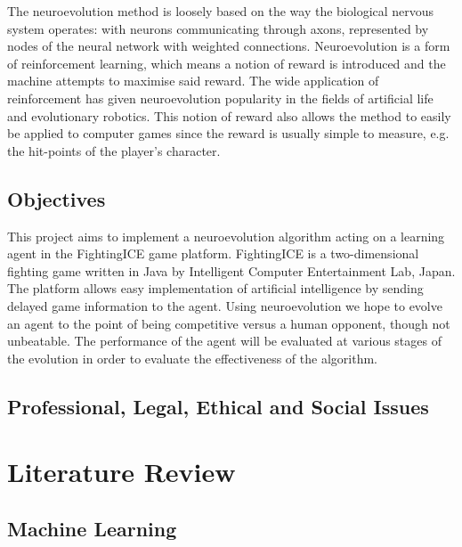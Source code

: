 \documentclass[11pt,a4paper]{article}
\begin{document}
The neuroevolution method is loosely based on the way the biological nervous system operates: with neurons communicating through axons, represented by nodes of the neural network with weighted connections. Neuroevolution is a form of reinforcement learning, which means a notion of reward is introduced and the machine attempts to maximise said reward. The wide application of reinforcement has given neuroevolution popularity in the fields of artificial life and evolutionary robotics. This notion of reward also allows the method to easily be applied to computer games since the reward is usually simple to measure, e.g. the hit-points of the player's character.\\

\subsection{Objectives}
This project aims to implement a neuroevolution algorithm acting on a learning agent in the FightingICE game platform. FightingICE is a two-dimensional fighting game written in Java by Intelligent Computer Entertainment Lab, Japan. The platform allows easy implementation of artificial intelligence by sending delayed game information to the agent. Using neuroevolution we hope to evolve an agent to the point of being competitive versus a human opponent, though not unbeatable. The performance of the agent will be evaluated at various stages of the evolution in order to evaluate the effectiveness of the algorithm. \\

\subsection{Professional, Legal, Ethical and Social Issues}

\newpage
\section{Literature Review}
\subsection{Machine Learning}
\end{document}
